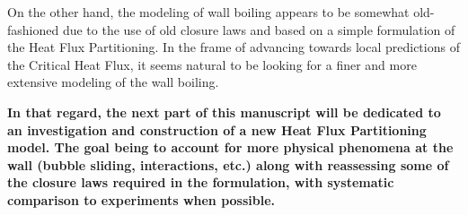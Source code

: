 \npar

On the other hand, the modeling of wall boiling appears to be somewhat old-fashioned due to the use of old closure laws and based on a simple formulation of the Heat Flux Partitioning. In the frame of advancing towards local predictions of the Critical Heat Flux, it seems natural to be looking for a finer and more extensive modeling of the wall boiling. 

\npar

\textbf{In that regard, the next part of this manuscript will be dedicated to an investigation and construction of a new Heat Flux Partitioning model. The goal being to account for more physical phenomena at the wall (bubble sliding, interactions, etc.) along with reassessing some of the closure laws required in the formulation, with systematic comparison to experiments when possible.}


\clearpage